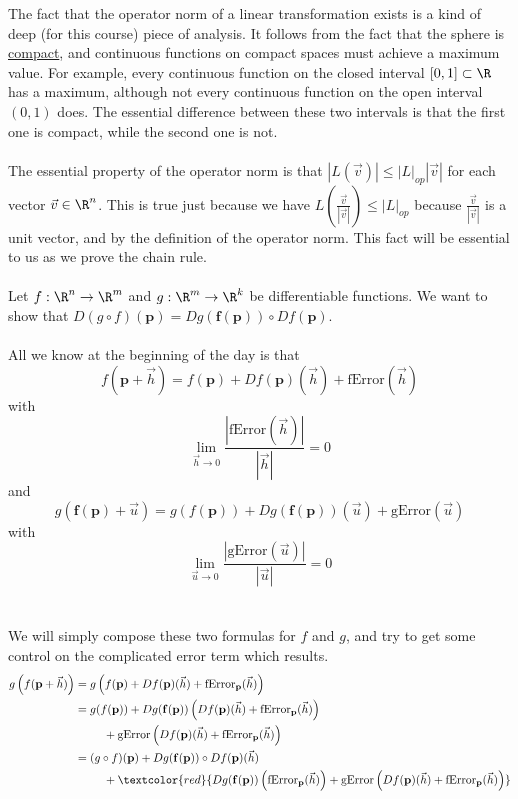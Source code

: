 \documentclass{ximera}
\begin{document}
	The fact that the operator norm of a linear transformation exists is a kind of deep (for this course) piece of analysis.  It follows from the fact that the sphere is
	\href{http://en.wikipedia.org/wiki/Compact_space}{compact}, and continuous functions on compact spaces must achieve a maximum value.  For example, every continuous function on the closed interval
	$[0,1] \subset \R$ has a maximum, although not every continuous function on the open interval $(0,1)$ does.  The essential difference between 
	these two intervals is that the first one is compact, while the second one is not.
	\\
	\\
	The essential property of the operator norm is that $|L(\vec{v})| \leq |L|_{op} |\vec{v}|$ for each vector $\vec{v} \in \R^n$.  This is true just because we have 
	$L(\frac{\vec{v}}{|\vec{v}|}) \leq |L|_{op}$ because $\frac{\vec{v}}{|\vec{v}|}$ is a unit vector, and by the definition of the operator norm.  This fact will be essential 
	to us as we prove the chain rule.
	\\
	\\
	Let $f:\R^n \to \R^m$ and $g:\R^m \to \R^k$ be differentiable functions.  
	We want to show that $D(g \circ f)(\mathbf{p}) = Dg(\mathbf{f(p)}) \circ Df(\mathbf{p})$.
	\\
	\\
	All we know at the beginning of the day is that  
	\[f(\mathbf{p}+\vec{h}) = f(\mathbf{p})+Df(\mathbf{p})(\vec{h})+\text{fError}(\vec{h})\]
	 with 
	\[\displaystyle\lim_{\vec{h} \to 0} \frac{\left| \text{fError}(\vec{h})\right|}{|\vec{h}|} = 0\]
	 and 
	 \[g(\mathbf{f(p)}+\vec{u}) = g(f(\mathbf{p}))+Dg(\mathbf{f(p)})(\vec{u})+\text{gError}(\vec{u})\]
	 with 
	\[ \displaystyle\lim_{\vec{u} \to 0} \frac{\left| \text{gError}(\vec{u})\right|}{|\vec{u}|} = 0\]
	\\
	\\
	We will simply compose these two formulas for $f$ and $g$, and try to get some control on the complicated error term which results.
	\begin{align*}
	g\left(f(\mathbf{p}+\vec{h})\right) &= g\left( f(\mathbf{p})+Df(\mathbf{p})(\vec{h})+\text{fError}_{\mathbf{p}}(\vec{h})\right)\\
		&= g(f(\mathbf{p}))+Dg(\mathbf{f(p)})\left(Df(\mathbf{p})(\vec{h})+ \text{fError}_{\mathbf{p}}(\vec{h})\right)\\
		&\hphantom{dsdsd}+\text{gError}\left(Df(\mathbf{p})(\vec{h})+\text{fError}_{\mathbf{p}}(\vec{h})\right)\\
		&= (g \circ f)(\mathbf{p})+Dg(\mathbf{f(p)}) \circ Df(\mathbf{p})(\vec{h})\\
		&\hphantom{dsdsd}+ \textcolor{red}{Dg(\mathbf{f(p)})\left(\text{fError}_{\mathbf{p}}(\vec{h})\right) + \text{gError}\left(Df(\mathbf{p})(\vec{h})+\text{fError}_{\mathbf{p}}(\vec{h})\right)}\\
	\end{align*}
	
\end{document}

